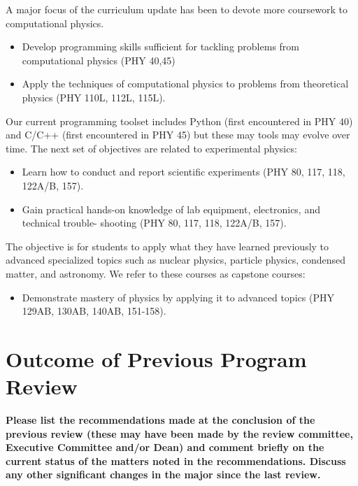 \documentclass[12pt]{article}
\begin{document}
A major focus of the curriculum update has been to devote more coursework to computational 
physics.
\begin{itemize}
 \item Develop programming skills sufficient for tackling problems from computational physics 
(PHY 40,45)
 \item Apply the techniques of computational physics to problems from theoretical physics (PHY 
110L, 112L, 115L).
\end{itemize}
Our current programming toolset includes Python (first encountered in
PHY 40) and C/C++ (first encountered in PHY 45) but these may tools
may evolve over time.  The next set of objectives are related to
experimental physics:
\begin{itemize}
 \item Learn how to conduct and report scientific experiments (PHY 80, 117, 118, 122A/B, 157).
 \item Gain practical hands-on knowledge of lab equipment, electronics, and technical trouble-
shooting (PHY 80, 117, 118, 122A/B, 157).
\end{itemize}
The objective is for students to apply what they have learned previously to advanced 
specialized topics such as nuclear physics, particle physics, condensed matter, and astronomy.  
We refer to these courses as capstone courses:
\begin{itemize}
 \item Demonstrate mastery of physics by applying it to advanced topics (PHY 129AB, 130AB, 
140AB, 151-158).
\end{itemize}

\newpage
\section{Outcome of Previous Program Review}
\label{sec:previous}

{\bf Please list the recommendations made at the conclusion of the previous review (these may 
have been made by the review committee, Executive Committee and/or Dean) and comment briefly 
on the current status of the matters noted in the recommendations. Discuss any other 
significant changes in the major since the last review.}\\
\end{document}
